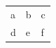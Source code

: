 \documentclass{article}
\begin{document}
\begin{tabular}{l>{\centering}p{2cm}>{\centering}p{2cm}}
a & b & c \\
d & e & f \\
\end{tabular}
\end{document}
